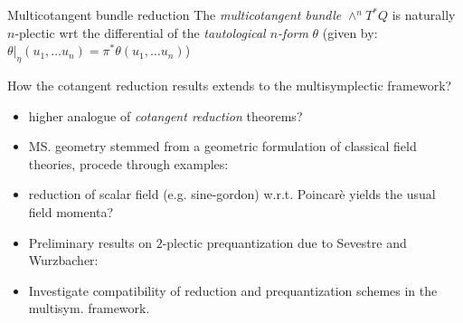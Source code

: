 \documentclass[handout,10pt]{beamer}
\begin{document}
\begin{frame}{Multicotangent bundle reduction}
			\alert{ The	\emph{multicotangent bundle} $\wedge^n T^\ast Q$ 	is naturally $n$-plectic wrt the differential of the \emph{tautological $n$-form} $\theta$ }
				\tiny \color{gray}
				(given by: $\theta \big\vert_\eta (u_1,\dots u_n) =  \pi^\ast \theta (u_1,\dots u_n)$)
				
	
	\vfill
	\pause
	\begin{probox}[colbacktitle=yellow!15!white ,colback=yellow!15!white]{ How the cotangent reduction results extends to the multisymplectic framework?}
		\begin{itemize}

			\item[\smark] higher analogue of \emph{cotangent reduction} theorems?
			\item[\cmark] MS. geometry stemmed from a geometric formulation of classical field theories, procede through examples: 
			\item[\smark] reduction of scalar field (e.g. sine-gordon) w.r.t. Poincarè yields the usual field momenta?
			\item[\cmark] Preliminary results on $2$-plectic prequantization due to Sevestre and Wurzbacher:
			\item[\smark] Investigate compatibility of reduction and prequantization schemes in the multisym. framework.
		\end{itemize}
	\end{probox}	

\end{frame}
\end{document}

